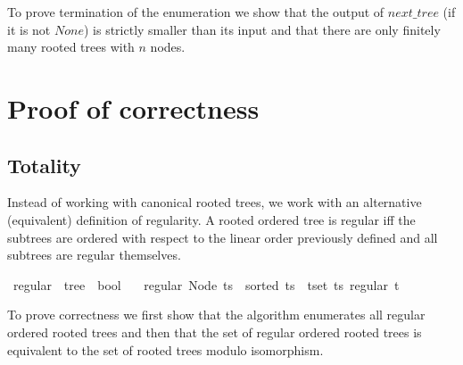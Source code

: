 To prove termination of the enumeration we show that the output of $next\_tree$ (if it is not $None$) is strictly smaller than its input and that there are only finitely many rooted trees with $n$ nodes.

\section{Proof of correctness}

\subsection{Totality}

Instead of working with canonical rooted trees, we work with an alternative (equivalent) definition of regularity.
A rooted ordered tree is regular iff the subtrees are ordered with respect to the linear order previously defined and all subtrees are regular themselves.

\begin{isabellebox}
    \isamarkupfalse%
    \ regular\ {\isacharcolon}{\kern0pt}{\isacharcolon}{\kern0pt}\ {\isachardoublequoteopen}tree\ {\isasymRightarrow}\ bool{\isachardoublequoteclose}\ \isanewline
    \ \ {\isachardoublequoteopen}regular\ {\isacharparenleft}{\kern0pt}Node\ ts{\isacharparenright}{\kern0pt}\ {\isasymlongleftrightarrow}\ sorted\ ts\ {\isasymand}\ {\isacharparenleft}{\kern0pt}{\isasymforall}t{\isasymin}set\ ts{\isachardot}{\kern0pt}\ regular\ t{\isacharparenright}{\kern0pt}{\isachardoublequoteclose}
\end{isabellebox}

To prove correctness we first show that the algorithm enumerates all regular ordered rooted trees and then that the set of regular ordered rooted trees is equivalent to the set of rooted trees modulo isomorphism.


